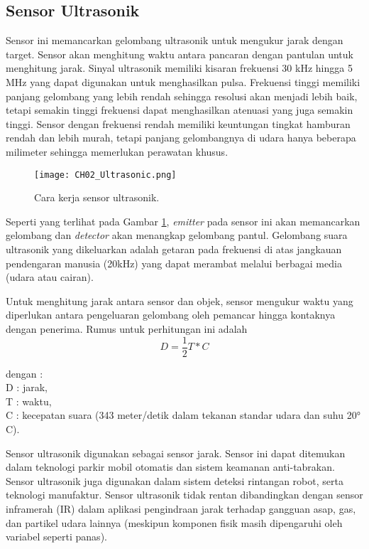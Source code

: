     \subsection{Sensor Ultrasonik}
    \label{subsec:Ultrasonik}
    Sensor ini memancarkan gelombang ultrasonik untuk mengukur jarak dengan target. Sensor akan menghitung waktu antara pancaran dengan pantulan untuk menghitung jarak. Sinyal ultrasonik memiliki kisaran frekuensi 30 kHz hingga 5 MHz yang dapat digunakan untuk menghasilkan pulsa. Frekuensi tinggi memiliki panjang gelombang yang lebih rendah sehingga resolusi akan menjadi lebih baik, tetapi semakin tinggi frekuensi dapat menghasilkan atenuasi yang juga semakin tinggi. Sensor dengan frekuensi rendah memiliki keuntungan tingkat hamburan rendah dan lebih murah, tetapi panjang gelombangnya di udara hanya beberapa milimeter sehingga memerlukan perawatan khusus\cite{bs1}.
    \begin{figure}[H]
        \centering
        \texttt{[image: CH02\_Ultrasonic.png]}
        \caption{Cara kerja sensor ultrasonik\cite{bs2}.}
        \label{fig:Ch02_ultrasonik}
    \end{figure}
    Seperti yang terlihat pada Gambar \ref{fig:Ch02_ultrasonik}, \textit{emitter} pada sensor ini akan memancarkan gelombang dan \textit{detector} akan menangkap gelombang pantul. Gelombang suara ultrasonik yang dikeluarkan adalah getaran pada frekuensi di atas jangkauan pendengaran manusia (\>20kHz) yang dapat merambat melalui berbagai media (udara atau cairan).

    Untuk menghitung jarak antara sensor dan objek, sensor mengukur waktu yang diperlukan antara pengeluaran gelombang oleh pemancar hingga kontaknya dengan penerima. Rumus untuk perhitungan ini adalah 
    \begin{equation}
        D = \frac{1}{2}T * C 
    \end{equation}
    \begin{tabbing}
        dengan : \= \\
        \>D : jarak,\\
        \>T : waktu,\\
        \>C : kecepatan suara (343 meter/detik dalam tekanan standar udara dan suhu 20° C).
    \end{tabbing}

    Sensor ultrasonik digunakan sebagai sensor jarak. Sensor ini dapat ditemukan dalam teknologi parkir mobil otomatis dan sistem keamanan anti-tabrakan. Sensor ultrasonik juga digunakan dalam sistem deteksi rintangan robot, serta teknologi manufaktur. Sensor ultrasonik tidak rentan dibandingkan dengan sensor inframerah (IR) dalam aplikasi pengindraan jarak terhadap gangguan asap, gas, dan partikel udara lainnya (meskipun komponen fisik masih dipengaruhi oleh variabel seperti panas).


